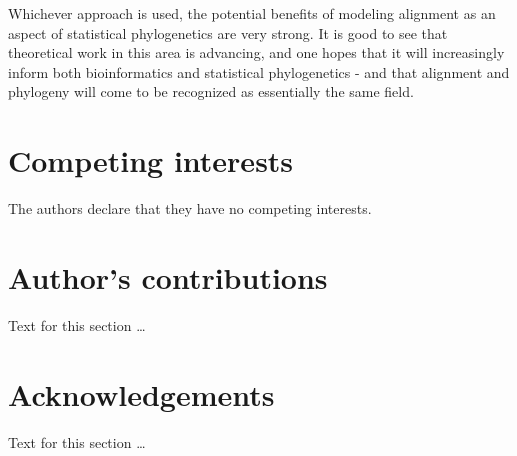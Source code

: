 \documentclass{bmcart}
\begin{document}
Whichever approach is used, the potential benefits of modeling alignment as an aspect of
statistical phylogenetics are very strong. It is good to see that theoretical work in this area
is advancing, and one hopes that it will increasingly inform both bioinformatics and statistical phylogenetics -
and that alignment and phylogeny will come to be recognized as essentially the same field.




\begin{backmatter}

\section*{Competing interests}
  The authors declare that they have no competing interests.

\section*{Author's contributions}
    Text for this section \ldots

\section*{Acknowledgements}
  Text for this section \ldots



\end{backmatter}
\end{document}
